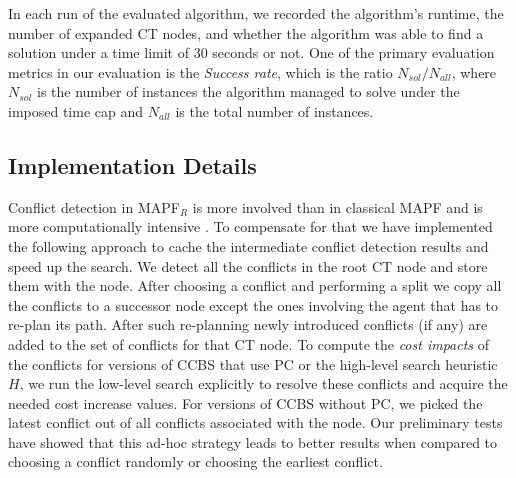 \documentclass[letterpaper]{article} %
\newcommand\roni[1]{\nb{\textbf{Roni:}}{orange}{#1}}
\newcommand{\ccbs}{\ac{CCBS}\xspace}
\newcommand{\ct}{\ac{CT}\xspace}
\newcommand{\mapfr}{{MAPF}$_R$\xspace}
\newcommand{\mapf}{\ac{MAPF}\xspace}
\newcommand{\pc}{\ac{PC}\xspace}
\begin{document}
In each run of the evaluated algorithm, we recorded the algorithm's runtime, the number of expanded \ct nodes, and whether the algorithm was able to find a solution under a time limit of 30 seconds or not. 
One of the primary evaluation metrics in our evaluation is the \emph{Success rate}, which is the ratio $N_{sol}/N_{all}$, where $N_{sol}$ is the number of instances the algorithm managed to solve under the imposed time cap and $N_{all}$ is the total number of instances. 





\subsection{Implementation Details}

Conflict detection in \mapfr is more involved than in classical \mapf and is more computationally intensive%
. 
To compensate for that we have implemented the following approach to cache the intermediate conflict detection results and speed up the search. 
We detect all the conflicts in the root \ct node and store them with the node. 
After choosing a conflict and performing a split we copy all the conflicts to a successor node except the ones involving the agent that has to re-plan its path. 
After such re-planning newly introduced conflicts (if any) are added to the set of conflicts for that \ct node. 
To compute the \emph{cost impacts} of the conflicts for versions of \ccbs that use \pc or the high-level search heuristic $H$, we run the low-level search explicitly to resolve these conflicts and acquire the needed cost increase values. For versions of \ccbs without \pc, we picked the latest conflict out of all conflicts associated with the node. Our preliminary tests have showed that this ad-hoc strategy leads to better results when compared to choosing a conflict randomly or choosing the earliest conflict.
\end{document}
